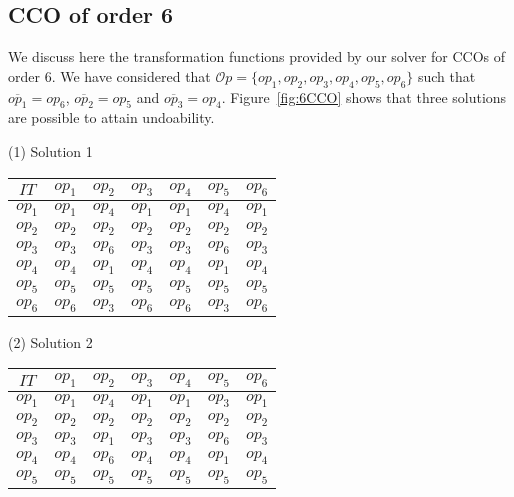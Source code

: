 \documentclass[submission,copyright,creativecommons]{eptcs}
\begin{document}
\subsection{CCO of order 6}
We discuss here the transformation functions provided by our solver 
for CCOs of order 6. We have considered that  $\mathcal{O}p=\{op_1, op_2, op_3, op_4, op_5, op_6\}$ such that $\overline{op_1}=op_6$, $\overline{op_2}=op_5$ and  $\overline{op_3}=op_4$. Figure~\ref{fig:6CCO} shows that three solutions are possible to attain undoability.
\begin{table*}[htbp]\begin{scriptsize}
\hfill\hfill
   \begin{minipage}[t]{0.33\linewidth}
\centerline{(1) Solution 1}
      \centering 
   \begin{tabular}{|c|c|c|c|c|c|c|}
\hline
$IT$&  $op_1$ &   $op_2$& $op_3$ &   $op_4$  & $op_5$ & $op_6$ \\ \hline
$op_1$& $op_1$& $op_4$ &$op_1$& $op_1$ &$op_4$ &$op_1$ \\ \hline 
$op_2$& $op_2$& $op_2$ &$op_2$& $op_2$ & $op_2$  & $op_2$ \\ \hline 
$op_3$& $op_3$& $op_6$ &$op_3$& $op_3$ &$op_6$ & $op_3$\\ \hline
$op_4$& $op_4$& $op_1$ &$op_4$& $op_4$ &$op_1$ & $op_4$ \\ \hline
$op_5$& $op_5$& $op_5$ &$op_5$& $op_5$ & $op_5$& $op_5$ \\ \hline
$op_6$& $op_6$& $op_3$ &$op_6$& $op_6$ & $op_3$ & $op_6$\\ \hline
\end{tabular}
   \end{minipage}
   \hfill\hfill
   \begin{minipage}[t]{0.5\linewidth}
\centerline{(2)  Solution 2}
      \centering      
      \begin{tabular}{|c|c|c|c|c|c|c|}
\hline
$IT$&  $op_1$ &   $op_2$& $op_3$ &   $op_4$& $op_5$ & $op_6$   \\ \hline
$op_1$& $op_1$& $op_4$ &$op_1$& $op_1$ & $op_3$& $op_1$\\ \hline 
$op_2$& $op_2$& $op_2$ &$op_2$& $op_2$ & $op_2$ & $op_2$ \\ \hline 
$op_3$& $op_3$& $op_1$ &$op_3$& $op_3$ &$op_6$ & $op_3$ \\ \hline
$op_4$& $op_4$& $op_6$ &$op_4$& $op_4$ & $op_1$& $op_4$\\ \hline
$op_5$& $op_5$& $op_5$ &$op_5$& $op_5$ & $op_5$& $op_5$ \\ \hline

\end{tabular}
\end{minipage}
\end{scriptsize}
\end{table*}
\end{document}
